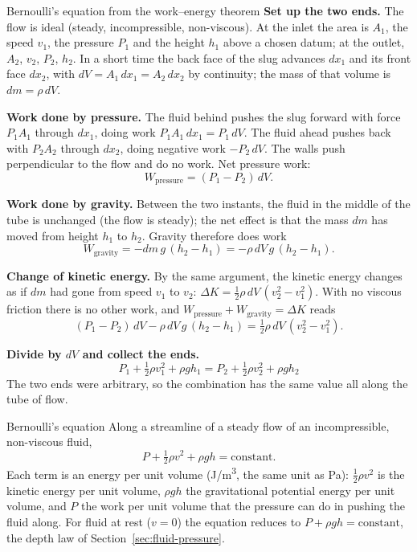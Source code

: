 \begin{derivbox}{Bernoulli's equation from the work--energy theorem}
 \textbf{Set up the two ends.} The flow is ideal (steady, incompressible, non-viscous). At the inlet
the area is $A_1$, the speed $v_1$, the pressure $P_1$ and the height $h_1$ above a chosen datum; at the
outlet, $A_2$, $v_2$, $P_2$, $h_2$. In a short time the back face of the slug advances $dx_1$ and its front
face $dx_2$, with $dV=A_1\,dx_1=A_2\,dx_2$ by continuity; the mass of that volume is $dm=\rho\,dV$.

 \textbf{Work done by pressure.} The fluid behind pushes the slug forward with force $P_1A_1$ through
$dx_1$, doing work $P_1A_1\,dx_1=P_1\,dV$. The fluid ahead pushes back with $P_2A_2$ through $dx_2$, doing
negative work $-P_2\,dV$. The walls push perpendicular to the flow and do no work. Net pressure work:
\[
W_{\text{pressure}}=(P_1-P_2)\,dV.
\]

 \textbf{Work done by gravity.} Between the two instants, the fluid in the middle of the tube is
unchanged (the flow is steady); the net effect is that the mass $dm$ has moved from height $h_1$ to $h_2$.
Gravity therefore does work
\[
W_{\text{gravity}}=-dm\,g\,(h_2-h_1)=-\rho\,dV\,g\,(h_2-h_1).
\]

 \textbf{Change of kinetic energy.} By the same argument, the kinetic energy changes as if $dm$ had
gone from speed $v_1$ to $v_2$: $\Delta K=\tfrac12\rho\,dV\,(v_2^2-v_1^2)$. With no viscous friction there is
no other work, and $W_{\text{pressure}}+W_{\text{gravity}}=\Delta K$ reads
\[
(P_1-P_2)\,dV-\rho\,dV\,g\,(h_2-h_1)=\tfrac12\rho\,dV\,(v_2^2-v_1^2).
\]

 \textbf{Divide by $dV$ and collect the ends.}
\[
\boxed{\;P_1+\tfrac12\rho v_1^2+\rho gh_1=P_2+\tfrac12\rho v_2^2+\rho gh_2\;}
\]
The two ends were arbitrary, so the combination has the same value all along the tube of flow.
\end{derivbox}

\begin{keybox}{Bernoulli's equation}
Along a streamline of a steady flow of an incompressible, non-viscous fluid,
\[
P+\tfrac12\rho v^2+\rho gh=\text{constant}.
\]
Each term is an energy per unit volume (\si{J/m^3}, the same unit as \si{Pa}): $\tfrac12\rho v^2$ is the
kinetic energy per unit volume, $\rho gh$ the gravitational potential energy per unit volume, and $P$ the
work per unit volume that the pressure can do in pushing the fluid along. For fluid at rest ($v=0$) the
equation reduces to $P+\rho gh=\text{constant}$, the depth law of Section~\ref{sec:fluid-pressure}.
\end{keybox}

